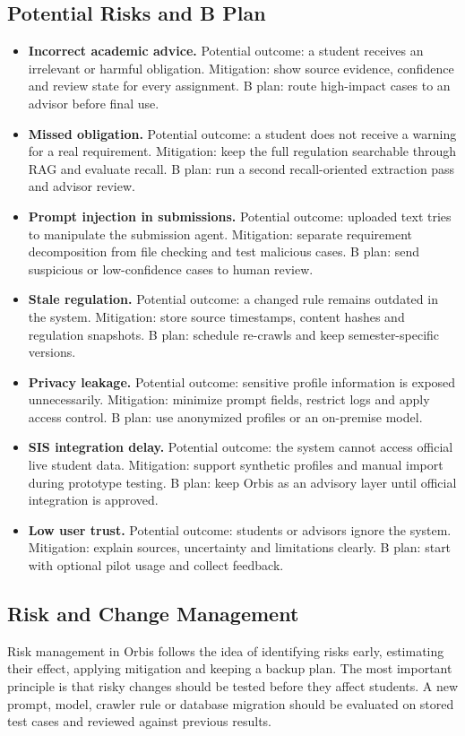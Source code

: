 \documentclass[a4paper,12pt]{article}
\begin{document}
\subsection{Potential Risks and B Plan}
\begin{itemize}
    \item \textbf{Incorrect academic advice.} Potential outcome: a student receives an irrelevant or harmful obligation. Mitigation: show source evidence, confidence and review state for every assignment. B plan: route high-impact cases to an advisor before final use.
    \item \textbf{Missed obligation.} Potential outcome: a student does not receive a warning for a real requirement. Mitigation: keep the full regulation searchable through RAG and evaluate recall. B plan: run a second recall-oriented extraction pass and advisor review.
    \item \textbf{Prompt injection in submissions.} Potential outcome: uploaded text tries to manipulate the submission agent. Mitigation: separate requirement decomposition from file checking and test malicious cases. B plan: send suspicious or low-confidence cases to human review.
    \item \textbf{Stale regulation.} Potential outcome: a changed rule remains outdated in the system. Mitigation: store source timestamps, content hashes and regulation snapshots. B plan: schedule re-crawls and keep semester-specific versions.
    \item \textbf{Privacy leakage.} Potential outcome: sensitive profile information is exposed unnecessarily. Mitigation: minimize prompt fields, restrict logs and apply access control. B plan: use anonymized profiles or an on-premise model.
    \item \textbf{SIS integration delay.} Potential outcome: the system cannot access official live student data. Mitigation: support synthetic profiles and manual import during prototype testing. B plan: keep Orbis as an advisory layer until official integration is approved.
    \item \textbf{Low user trust.} Potential outcome: students or advisors ignore the system. Mitigation: explain sources, uncertainty and limitations clearly. B plan: start with optional pilot usage and collect feedback.
\end{itemize}

\subsection{Risk and Change Management}
Risk management in Orbis follows the idea of identifying risks early, estimating their effect, applying mitigation and keeping a backup plan. The most important principle is that risky changes should be tested before they affect students. A new prompt, model, crawler rule or database migration should be evaluated on stored test cases and reviewed against previous results.
\end{document}
